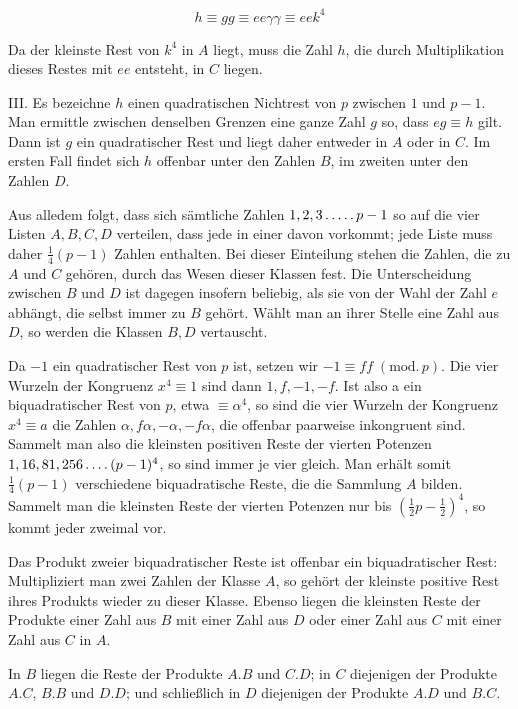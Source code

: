 \[
h\equiv gg\equiv ee\gamma\gamma\equiv eek^4
\]

Da der kleinste Rest von $k^4$ in $A$ liegt, muss die Zahl $h$, die durch Multiplikation dieses Restes mit $ee$ entsteht, in $C$ liegen.

III. Es bezeichne $h$ einen quadratischen Nichtrest von $p$ zwischen $1$ und $p-1$. Man ermittle zwischen denselben Grenzen eine ganze Zahl $g$ so, dass $eg\equiv h$ gilt. Dann ist $g$ ein quadratischer Rest und liegt daher entweder in $A$ oder in $C$. Im ersten Fall findet sich $h$ offenbar unter den Zahlen $B$, im zweiten unter den Zahlen $D$.

Aus alledem folgt, dass sich sämtliche Zahlen $1,2,3\mathinner{.\,.\,.\,.\,.} p-1$ so auf die vier Listen $A,B,C,D$ verteilen, dass jede in einer davon vorkommt; jede Liste muss daher $\tfrac14(p-1)$ Zahlen enthalten. Bei dieser Einteilung stehen die Zahlen, die zu $A$ und $C$ gehören, durch das Wesen dieser Klassen fest. Die Unterscheidung zwischen $B$ und $D$ ist dagegen insofern beliebig, als sie von der Wahl der Zahl $e$ abhängt, die selbst immer zu $B$ gehört. Wählt man an ihrer Stelle eine Zahl aus $D$, so werden die Klassen $B,D$ vertauscht.

Da $-1$ ein quadratischer Rest von $p$ ist, setzen wir $-1\equiv ff\; (\mathrm{mod.}\,p)$. Die vier Wurzeln der Kongruenz $x^4\equiv1$ sind dann $1,f,-1,-f$. Ist also\space%
%
a ein biquadratischer Rest von $p$, etwa $\equiv\alpha^4$, so sind die vier Wurzeln der Kongruenz $x^4\equiv a$ die Zahlen $\alpha,f\alpha,-\alpha,-f\alpha$, die offenbar paarweise inkongruent sind. Sammelt man also die kleinsten positiven Reste der vierten Potenzen $1,16,81,256\mathinner{.\,.\,.\,.}(p-1)^4$, so sind immer je vier gleich. Man erhält somit $\tfrac14(p-1)$ verschiedene biquadratische Reste, die die Sammlung $A$ bilden. Sammelt man die kleinsten Reste der vierten Potenzen nur bis $(\tfrac12p-\tfrac12)^4$, so kommt jeder zweimal vor.

Das Produkt zweier biquadratischer Reste ist offenbar ein biquadratischer Rest: Multipliziert man zwei Zahlen der Klasse $A$, so gehört der kleinste positive Rest ihres Produkts wieder zu dieser Klasse. Ebenso liegen die kleinsten Reste der Produkte einer Zahl aus $B$ mit einer Zahl aus $D$ oder einer Zahl aus $C$ mit einer Zahl aus $C$ in $A$.

In $B$ liegen die Reste der Produkte $A.B$ und $C.D$; in $C$ diejenigen der Produkte $A.C$, $B.B$ und $D.D$; und schließlich in $D$ diejenigen der Produkte $A.D$ und $B.C$.

